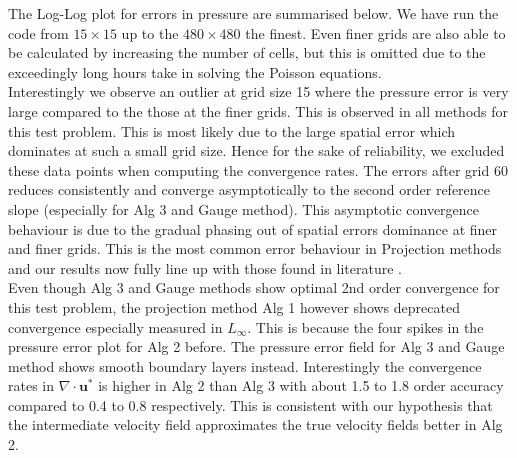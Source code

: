 The Log-Log plot for errors in pressure are summarised below. We have run the code from $15 \times 15$ up to the $480 \times 480$ the finest. Even finer grids are also able to be calculated by increasing the number of cells, but this is omitted due to the exceedingly long hours take in solving the Poisson equations.\\

Interestingly we observe an outlier at grid size 15 where the pressure error is very large compared to the those at the finer grids. This is observed in all methods for this test problem. This is most likely due to the large spatial error which dominates at such a small grid size. Hence for the sake of reliability, we excluded these data points when computing the convergence rates. The errors after grid 60 reduces consistently and converge asymptotically to the second order reference slope (especially for Alg 3 and Gauge method). This asymptotic convergence behaviour is due to the gradual phasing out of spatial errors dominance at finer and finer grids. This is the most common error behaviour in Projection methods and our results now fully line up with those found in literature \cite{guermond2004error}. \\

Even though Alg 3 and Gauge methods show optimal 2nd order convergence for this test problem, the projection method Alg 1 however shows deprecated convergence especially measured in $L_\infty$. This is because the four spikes in the pressure error plot for Alg 2 before. The pressure error field for Alg 3 and Gauge method shows smooth boundary layers instead. Interestingly the convergence rates in $\nabla \cdot \textbf{u}^*$ is higher in Alg 2 than Alg 3 with about 1.5 to 1.8 order accuracy compared to 0.4 to 0.8 respectively. This is consistent with our hypothesis that the intermediate velocity field approximates the true velocity fields better in Alg 2. \\

